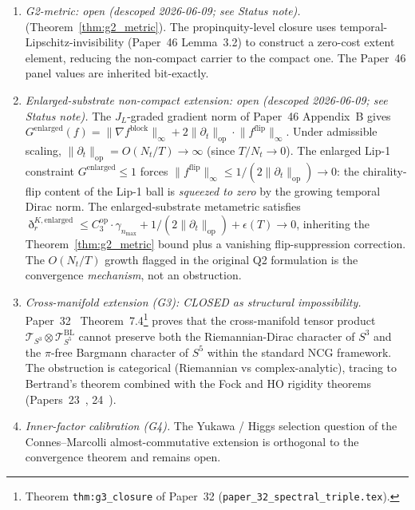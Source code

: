 \documentclass[11pt,a4paper]{article}
\theoremstyle{plain}
\theoremstyle{definition}
\newcommand{\nmax}{n_{\max}}
\newcommand{\Nt}{N_{t}}
\newcommand{\sthree}{S^{3}}
\newcommand{\Tcal}{\mathcal{T}}
\newcommand{\opnorm}[1]{\lVert #1 \rVert_{\mathrm{op}}}
\newcommand{\norm}[1]{\lVert #1 \rVert}
\newcommand{\JL}{J_{L}}
\newcommand{\Cthreeop}{C_{3}^{\mathrm{op}}}
\begin{document}
\begin{enumerate}
\item[(Q1)] \emph{G2-metric: open (descoped 2026-06-09; see Status note).}
(Theorem~\ref{thm:g2_metric}). The propinquity-level closure uses
temporal-Lipschitz-invisibility (Paper~46 Lemma~3.2) to construct a
zero-cost extent element, reducing the non-compact carrier to the
compact one. The Paper~46 panel values are inherited bit-exactly.

\item[(Q2)] \emph{Enlarged-substrate non-compact extension: open
(descoped 2026-06-09; see Status note).}
The $\JL$-graded gradient norm of Paper~46 Appendix~B gives
$G^{\mathrm{enlarged}}(f) = \norm{\nabla f^{\mathrm{block}}}_{\infty}
+ 2\opnorm{\partial_{t}} \cdot \norm{f^{\mathrm{flip}}}_{\infty}$.
Under admissible scaling, $\opnorm{\partial_{t}} = O(\Nt / T) \to \infty$
(since $T / \Nt \to 0$). The enlarged Lip-1 constraint
$G^{\mathrm{enlarged}} \le 1$ forces
$\norm{f^{\mathrm{flip}}}_{\infty} \le 1/(2\opnorm{\partial_{t}})
\to 0$: the chirality-flip content of the Lip-1 ball is
\emph{squeezed to zero} by the growing temporal Dirac norm.
The enlarged-substrate metametric satisfies
$\eth_{r}^{K,\mathrm{enlarged}} \le \Cthreeop \cdot \gamma_{\nmax}
+ 1/(2\opnorm{\partial_{t}}) + \epsilon(T) \to 0$,
inheriting the Theorem~\ref{thm:g2_metric} bound plus a vanishing
flip-suppression correction. The $O(\Nt/T)$ growth flagged in the
original Q2 formulation is the convergence \emph{mechanism}, not an
obstruction.

\item[(Q3)] \emph{Cross-manifold extension (G3): CLOSED as structural
impossibility.} Paper~32~\cite{paper32}
Theorem~7.4\footnote{Theorem \texttt{thm:g3\_closure} of Paper~32
(\texttt{paper\_32\_spectral\_triple.tex}).}
proves that the cross-manifold tensor product
$\Tcal_{\sthree} \otimes \Tcal^{\mathrm{BL}}_{S^5}$ cannot preserve
both the Riemannian-Dirac character of $S^3$ and the $\pi$-free
Bargmann character of $S^5$ within the standard NCG framework. The
obstruction is categorical (Riemannian vs complex-analytic), tracing
to Bertrand's theorem combined with the Fock and HO rigidity theorems
(Papers~23~\cite{paper23}, 24~\cite{paper24}).

\item[(Q4)] \emph{Inner-factor calibration (G4).} The Yukawa /
Higgs selection question of the Connes--Marcolli almost-commutative
extension is orthogonal to the convergence theorem and remains open.
\end{enumerate}
\end{document}
